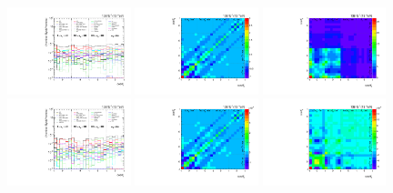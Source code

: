 \begin{figure}[htb]
\begin{center}
 \includegraphics[width=0.32\textwidth]{fig_fullRun2UL/unfolding/combined/deltaSystCombinedlog_rebinnedB_b2r_mttbar.pdf}
 \includegraphics[width=0.32\textwidth]{fig_fullRun2UL/unfolding/combined/StatCovMatrix_rebinnedB_b2r_mttbar.pdf}
 \includegraphics[width=0.32\textwidth]{fig_fullRun2UL/unfolding/combined/TotalSystCovMatrix_rebinnedB_b2r_mttbar.pdf} \\
 \includegraphics[width=0.32\textwidth]{fig_fullRun2UL/unfolding/combined/deltaSystCombinedlogNorm_rebinnedB_b2r_mttbar.pdf}
 \includegraphics[width=0.32\textwidth]{fig_fullRun2UL/unfolding/combined/StatCovMatrixNorm_rebinnedB_b2r_mttbar.pdf}
 \includegraphics[width=0.32\textwidth]{fig_fullRun2UL/unfolding/combined/TotalSystCovMatrixNorm_rebinnedB_b2r_mttbar.pdf} \\

\end{center}
\end{figure}
